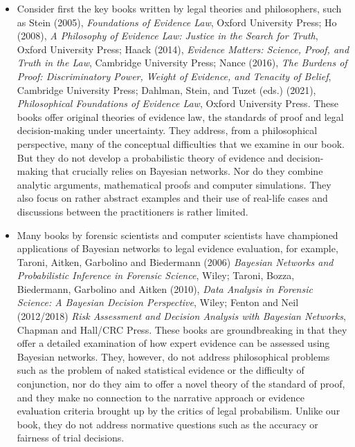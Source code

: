 \documentclass[
  10pt,
  dvipsnames,enabledeprecatedfontcommands]{scrartcl}
\begin{document}
\begin{itemize}

\item Consider first the key books written by legal theories and philosophers, such as 
Stein (2005), \textit{Foundations of Evidence Law}, Oxford University Press; Ho (2008), \textit{A Philosophy of Evidence Law: Justice in the Search for Truth}, Oxford University Press; Haack (2014), \textit{Evidence Matters: Science, Proof, and Truth in the Law}, Cambridge University Press; Nance (2016), \textit{The Burdens of Proof: Discriminatory Power, Weight of Evidence, and Tenacity of Belief}, Cambridge University Press;    Dahlman, Stein, and Tuzet (eds.) (2021), \textit{Philosophical Foundations of Evidence Law}, Oxford University Press.
These books offer original theories of evidence law, the standards of proof and legal decision-making  under uncertainty.   They address, from a philosophical perspective, many of the conceptual difficulties that we examine in our book. But they do not develop a probabilistic theory of evidence and decision-making that crucially relies on Bayesian networks.  Nor do they combine analytic arguments, mathematical proofs and computer simulations.  They also focus on rather abstract examples and their use of real-life cases and discussions between the practitioners is rather limited.

\item  Many books by forensic scientists and computer scientists  have championed applications of Bayesian networks to legal evidence evaluation, for example, Taroni, Aitken, Garbolino and Biedermann (2006) \textit{Bayesian Networks and Probabilistic Inference in Forensic Science}, Wiley;   Taroni,  Bozza,  Biedermann, Garbolino and  Aitken (2010), \textit{Data Analysis in Forensic Science: A Bayesian Decision Perspective}, Wiley; Fenton and Neil (2012/2018) \textit{Risk Assessment and Decision Analysis with Bayesian Networks}, Chapman and Hall/CRC Press. These books are groundbreaking in that they offer a detailed examination of how expert evidence can be assessed using Bayesian networks. They, however, do not address philosophical problems such as the problem of naked statistical evidence or the difficulty of conjunction, nor do they aim to offer a novel theory of the standard of proof, and they make no connection to the  narrative approach or evidence evaluation criteria brought up by the critics of legal probabilism. Unlike our book, they do not address normative questions such as the accuracy or fairness of trial decisions.


\end{itemize}
\end{document}
